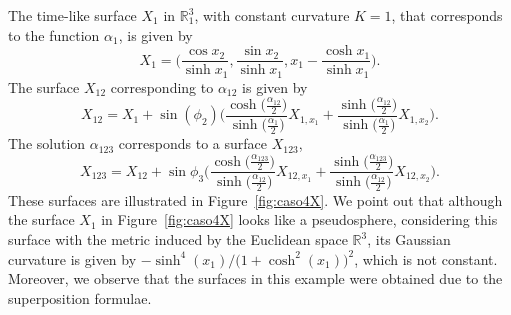 \documentclass[pdftex]{sigma}
\numberwithin{equation}{section}
\begin{document}
\begin{Example}
The time-like surface $X_1$ in ${\mathbb{R}}^3_1$, with constant curvature $K=1$, that corresponds to the function $\alpha_1$, is given by
\begin{equation}\label{superfalpha1caso4}
X_1=\biggl( \frac{\cos x_2}{\sinh x_1}, \frac{\sin x_2}{\sinh x_1}, x_1-\frac{\cosh x_1}{\sinh x_1} \biggr).
\end{equation}
 The surface $X_{12}$ corresponding to $\alpha_{12}$ is given
by
\[
X_{12}= X_1+\sin(\phi_2)\Biggl( \frac{ \cosh\bigl(\frac{\alpha_{12}}{2}\bigr)}{\sinh\bigl(\frac{\alpha_1}{2}\bigr)} X_{1,x_1} + \frac{ \sinh\bigl(\frac{\alpha_{12}}{2}\bigr)}{\sinh\bigl(\frac{\alpha_1}{2}\bigr)} X_{1,x_2}\Biggr).
\]
The solution $\alpha_{123}$ corresponds to a surface $X_{123}$,
\[
X_{123}= X_{12}+\sin\phi_3\Biggl( \frac{ \cosh\bigl(\frac{\alpha_{123}}{2}\bigr)}{\sinh\bigl(\frac{\alpha_{12}}{2}\bigr)} X_{12,x_1} + \frac{ \sinh\bigl(\frac{\alpha_{123}}{2}\bigr)}{\sinh\bigl(\frac{\alpha_{12}}{2}\bigr)} X_{12,x_2}\Biggr).
\]
These surfaces are illustrated in Figure~\ref{fig:caso4X}. We point out that although the surface $X_1$ in Figure~\ref{fig:caso4X} looks like a pseudosphere, considering this surface with the metric induced by the Euclidean space ${\mathbb{R}}^3$, its Gaussian curvature is given by $-\sinh^4(x_1)/ \bigl(1+\cosh^2(x_1)\bigr)^2$, which is not constant. Moreover, we observe that the surfaces in this example were obtained due to the superposition formulae.
\end{Example}
\end{document}
